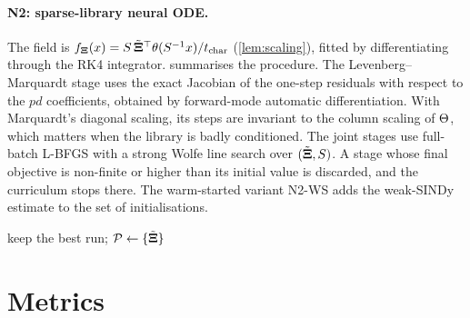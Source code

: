 \paragraph{N2: sparse-library neural ODE.} The field is $f_{\bm{\Xi}}(x)=S\,\tilde{\bm{\Xi}}^\top\theta(S^{-1}x)/t_{\mathrm{char}}$ (\cref{lem:scaling}), fitted by differentiating through the RK4 integrator.  summarises the procedure. The Levenberg--Marquardt stage \parencite{marquardt1963} uses the exact Jacobian of the one-step residuals with respect to the $pd$ coefficients, obtained by forward-mode automatic differentiation. With Marquardt's diagonal scaling, its steps are invariant to the column scaling of $\Theta$, which matters when the library is badly conditioned. The joint stages use full-batch L-BFGS \parencite{liu1989lbfgs} with a strong Wolfe line search over $(\tilde{\bm{\Xi}},S)$. A stage whose final objective is non-finite or higher than its initial value is discarded, and the curriculum stops there. The warm-started variant N2-WS adds the weak-SINDy estimate to the set of initialisations.

\begin{algorithm}[t]
\caption{Sparse-library neural ODE (N2)}\label{alg:n2}
\DontPrintSemicolon
{}
keep the best run; $\mathcal P\leftarrow\{\tilde{\bm{\Xi}}\}$\;
\end{algorithm}

\section{Metrics}\label{sec:metrics}

